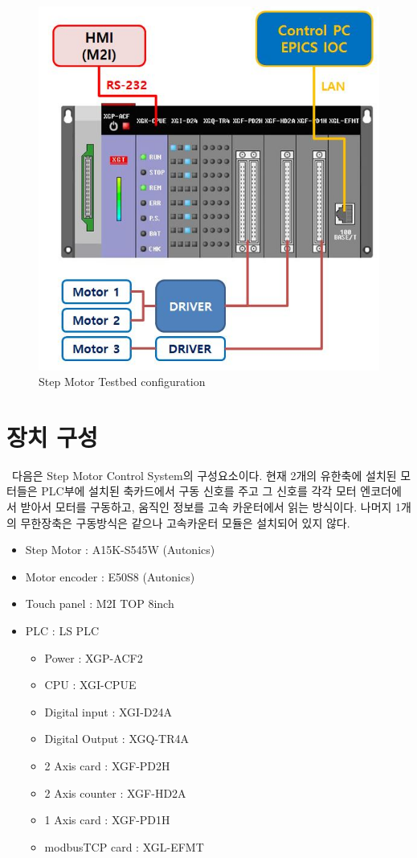\documentclass[11pt
  , a4paper
  , article
  , oneside
]{memoir}
\begin{document}
\begin{figure}[h]
	\centering
	\includegraphics[width=0.8 \textwidth]{./picture/diagram.JPG}
	\caption{
		Step Motor Testbed configuration
	}
	\label{fig:}
\end{figure}


\section{장치 구성}\
다음은 Step Motor Control System의 구성요소이다. 현재 2개의 유한축에 설치된 모터들은 PLC부에 설치된 축카드에서 구동 신호를 주고 그 신호를 각각 모터 엔코더에서 받아서 모터를 구동하고, 움직인 정보를 고속 카운터에서 읽는 방식이다. 나머지 1개의 무한장축은 구동방식은 같으나 고속카운터 모듈은 설치되어 있지 않다. 

\begin{itemize}
\item Step Motor			: A15K-S545W (Autonics)
\item Motor encoder		    : E50S8 (Autonics)
\item Touch panel			: M2I TOP 8inch
\item PLC				    : LS PLC
\begin{itemize}
\item Power					: XGP-ACF2
\item CPU			        : XGI-CPUE
\item Digital input         : XGI-D24A
\item Digital Output	    : XGQ-TR4A
\item 2 Axis card		    : XGF-PD2H
\item 2 Axis counter		: XGF-HD2A
\item 1 Axis card		    : XGF-PD1H
\item modbusTCP card		: XGL-EFMT
\end{itemize}
\end{itemize}
\end{document}
